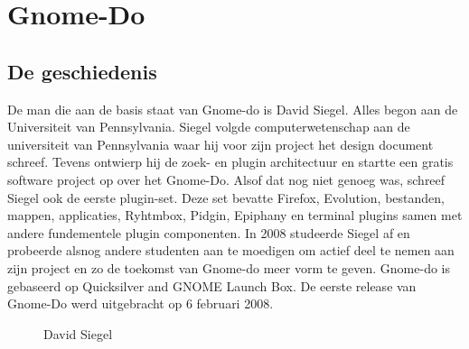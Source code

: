 \documentclass[12pt]{article} %
\begin{document}
\tableofcontents %

\newpage %

\listoffigures

\newpage %

\listoftables

\newpage %


\section{Gnome-Do} %



\subsection{De geschiedenis} %
De man die aan de basis staat van Gnome-do is David Siegel. Alles begon aan de Universiteit van Pennsylvania. Siegel volgde computerwetenschap aan de universiteit van Pennsylvania waar hij voor zijn project het design document schreef. Tevens ontwierp hij de zoek- en plugin architectuur en startte een gratis software project op over het Gnome-Do. Alsof dat nog niet genoeg was, schreef Siegel ook de eerste plugin-set. Deze set bevatte Firefox, Evolution, bestanden, mappen, applicaties, Ryhtmbox, Pidgin, Epiphany en terminal plugins samen met andere fundementele plugin componenten. In 2008 studeerde Siegel af en probeerde alsnog andere studenten aan te moedigen om actief deel te nemen aan zijn project en zo de toekomst van Gnome-do meer vorm te geven. Gnome-do is gebaseerd op Quicksilver and GNOME Launch Box. De eerste release van Gnome-Do werd uitgebracht op 6 februari 2008. \cite{David}

\begin{figure}[H]
\caption{David Siegel}
\label{David Siegel}
\end{figure}
\end{document}
